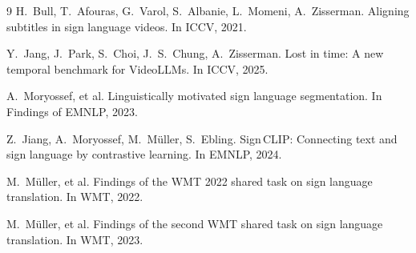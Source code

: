 \documentclass[11pt,a4paper]{article}
\def\emph#1{#1}%
\begin{document}
\begin{thebibliography}{9}
\small
{}
H.~Bull, T.~Afouras, G.~Varol, S.~Albanie, L.~Momeni, A.~Zisserman.
\newblock Aligning subtitles in sign language videos.
\newblock In \emph{ICCV}, 2021.

Y.~Jang, J.~Park, S.~Choi, J.~S.~Chung, A.~Zisserman.
\newblock Lost in time: A new temporal benchmark for VideoLLMs.
\newblock In \emph{ICCV}, 2025.

A.~Moryossef, et al.
\newblock Linguistically motivated sign language segmentation.
\newblock In \emph{Findings of EMNLP}, 2023.

Z.~Jiang, A.~Moryossef, M.~M{\"u}ller, S.~Ebling.
\newblock Sign\,CLIP: Connecting text and sign language by contrastive learning.
\newblock In \emph{EMNLP}, 2024.

M.~M{\"u}ller, et al.
\newblock Findings of the WMT 2022 shared task on sign language translation.
\newblock In \emph{WMT}, 2022.

M.~M{\"u}ller, et al.
\newblock Findings of the second WMT shared task on sign language translation.
\newblock In \emph{WMT}, 2023.
\end{thebibliography}
\end{document}

